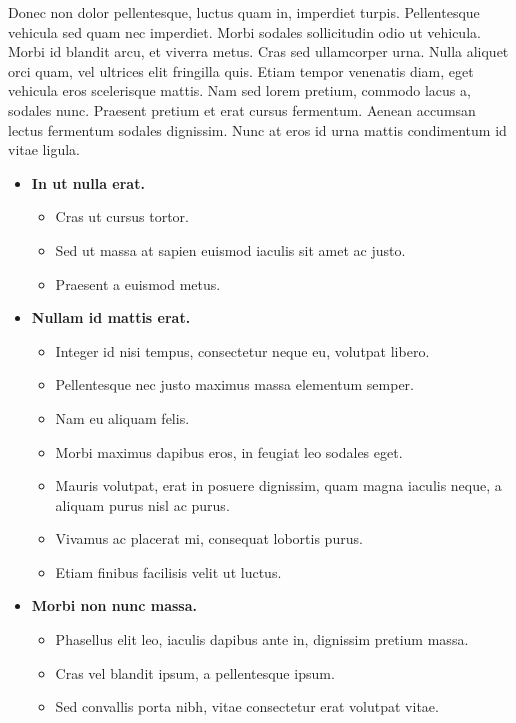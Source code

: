 \documentclass[a4paper, 10pt, twoside]{article}
\begin{document}
Donec non dolor pellentesque, luctus quam in, imperdiet turpis. Pellentesque vehicula sed quam nec imperdiet. Morbi sodales sollicitudin odio ut vehicula. Morbi id blandit arcu, et viverra metus. Cras sed ullamcorper urna. Nulla aliquet orci quam, vel ultrices elit fringilla quis. Etiam tempor venenatis diam, eget vehicula eros scelerisque mattis. Nam sed lorem pretium, commodo lacus a, sodales nunc. Praesent pretium et erat cursus fermentum. Aenean accumsan lectus fermentum sodales dignissim. Nunc at eros id urna mattis condimentum id vitae ligula.

\begin{itemize}

  \item \textbf{In ut nulla erat.}
  \begin{itemize}
    \item Cras ut cursus tortor.
    \item Sed ut massa at sapien euismod iaculis sit amet ac justo.
    \item Praesent a euismod metus.
  \end{itemize}

  \item \textbf{Nullam id mattis erat.}
  \begin{itemize}
    \item Integer id nisi tempus, consectetur neque eu, volutpat libero.
    \item Pellentesque nec justo maximus massa elementum semper.
    \item Nam eu aliquam felis.
    \item Morbi maximus dapibus eros, in feugiat leo sodales eget.
    \item Mauris volutpat, erat in posuere dignissim, quam magna iaculis neque, a aliquam purus nisl ac purus.
    \item Vivamus ac placerat mi, consequat lobortis purus.
    \item Etiam finibus facilisis velit ut luctus.
  \end{itemize}

  \item \textbf{Morbi non nunc massa.}
  \begin{itemize}
    \item Phasellus elit leo, iaculis dapibus ante in, dignissim pretium massa.
    \item Cras vel blandit ipsum, a pellentesque ipsum.
    \item Sed convallis porta nibh, vitae consectetur erat volutpat vitae.
  \end{itemize}

\end{itemize}
\end{document}
